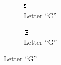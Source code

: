 \documentclass[a4paper,12pt]{report}
\begin{document}
\begin{figure}
\begin{subfigure}[h!]{0.3\textwidth}
        \end{subfigure}
        
        \vskip 6cm
        \begin{subfigure}[h!]{0.3\textwidth}
                \includegraphics[width=\textwidth]{C.png}
                \caption{Letter ``C''}
                
        \end{subfigure}
        \quad \quad \quad \quad \quad \quad
        \begin{subfigure}[h!]{0.3\textwidth}
                \includegraphics[width=\textwidth]{G.png}
                \caption{Letter ``G''}
                

\end{subfigure}
\end{figure}
\end{document}
